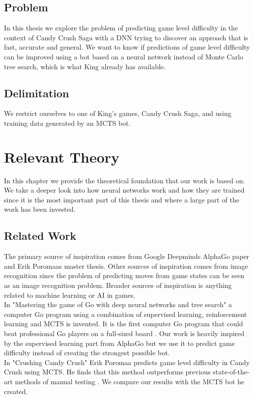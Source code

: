 \documentclass{kththesis}
\begin{document}
\section{Problem}
In this thesis we explore the problem of predicting game level difficulty in the context of Candy Crush Saga with a DNN trying to discover an approach that is fast, accurate and general. We want to know if predictions of game level difficulty can be improved using a bot based on a neural network instead of Monte Carlo tree search, which is what King already has available.

\section{Delimitation}
We restrict ourselves to one of King's games, Candy Crush Saga, and using training data generated by an MCTS bot.

\chapter{Relevant Theory}
In this chapter we provide the  theoretical foundation that our work is based on. We take a deeper look into how neural networks work and how they are trained since it is the most important part of this thesis and where a large part of the work has been invested.

\section{Related Work}
The primary source of inspiration comes from  Google Deepminds AlphaGo paper and Erik Poromaas master thesis. Other sources of inspiration comes from image recognition since the problem of predicting moves from game states can be seen as an image recognition problem. Broader sources of inspiration is anything related to machine learning or AI in games.\\

In "Mastering the game of Go with deep neural networks and tree search" a computer Go program using a combination of supervised learning, reinforcement learning and MCTS is invented. It is the first computer Go program that could beat professional Go players on a full-sized board \cite{alphaGo2016}. Our work is heavily inspired by the supervised learning part from AlphaGo but we use it to predict game difficulty instead of creating the strongest possible bot. \\

In "Crushing Candy Crush" Erik Poromaa predicts game level difficulty in Candy Crush using MCTS. He finds that this method outperforms previous state-of-the-art methods of manual testing \cite{poromaa2016}. We compare our results with the MCTS bot he created. \\
\end{document}
